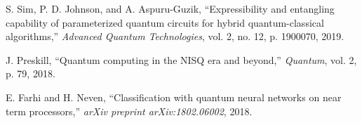 \documentclass[11pt]{article}
\begin{document}
\begin{thebibliography}{50}
S. Sim, P. D. Johnson, and A. Aspuru-Guzik, ``Expressibility and entangling capability of parameterized quantum circuits for hybrid quantum-classical algorithms,'' \textit{Advanced Quantum Technologies}, vol. 2, no. 12, p. 1900070, 2019.

J. Preskill, ``Quantum computing in the NISQ era and beyond,'' \textit{Quantum}, vol. 2, p. 79, 2018.

E. Farhi and H. Neven, ``Classification with quantum neural networks on near term processors,'' \textit{arXiv preprint arXiv:1802.06002}, 2018.

\end{thebibliography}
\end{document}
